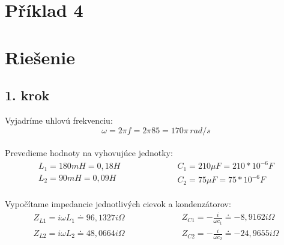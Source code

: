 \section{Příklad 4}

\section*{Riešenie}
\subsection*{1. krok}
Vyjadríme uhlovú frekvenciu:$$\omega = 2 \pi f = 2 \pi 85 = 170\pi \, rad/s$$\\
Prevedieme hodnoty na vyhovujúce jednotky:
\begin{equation*}
    \begin{aligned}
        L_1 = 180mH = 0,18H\\
        L_2 = 90mH = 0,09H
    \end{aligned}
    \qquad\qquad\qquad
    \begin{aligned}
        C_1 = 210\mu F = 210*10^{-6}F\\
        C_2 = 75\mu F = 75*10^{-6}F
    \end{aligned}
\end{equation*}\\
Vypočítame impedancie jednotlivých cievok a kondenzátorov:
\begin{equation*}
    \begin{aligned}
        Z_{L1} = i \omega L_1 \doteq 96,1327i \Omega\\\\
        Z_{L2} = i \omega L_2 \doteq 48,0664i \Omega
    \end{aligned}
    \qquad\qquad\qquad
    \begin{aligned}
        Z_{C1} = -\frac{i}{\omega c_1 }\doteq -8,9162i \Omega\\
        Z_{C2} = -\frac{i}{\omega c_2} \doteq -24,9655i \Omega
    \end{aligned}
\end{equation*}

\newpage
